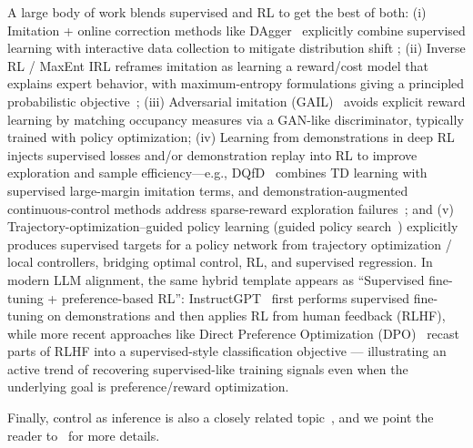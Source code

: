 \documentclass[10pt]{article} %
\begin{document}
A large body of work blends supervised and RL to get the best of both: (i) Imitation + online correction methods like DAgger~\citep{ross2011reductionimitationlearningstructured} explicitly combine supervised learning with interactive data collection to mitigate distribution shift ; (ii) Inverse RL / MaxEnt IRL reframes imitation as learning a reward/cost model that explains expert behavior, with maximum-entropy formulations giving a principled probabilistic objective~\citep{maximum_entropy_inverse_reinforcement_learning}; (iii) Adversarial imitation (GAIL)~\citep{ho2016generativeadversarialimitationlearning} avoids explicit reward learning by matching occupancy measures via a GAN-like discriminator, typically trained with policy optimization; (iv) Learning from demonstrations in deep RL injects supervised losses and/or demonstration replay into RL to improve exploration and sample efficiency—e.g., DQfD~\citep{hester2017deepqlearningdemonstrations} combines TD learning with supervised large-margin imitation terms, and demonstration-augmented continuous-control methods address sparse-reward exploration failures~\citep{nair2018overcomingexplorationreinforcementlearning}; and (v) Trajectory-optimization–guided policy learning (guided policy search~\citep{guided_policy_search}) explicitly produces supervised targets for a policy network from trajectory optimization / local controllers, bridging optimal control, RL, and supervised regression. In modern LLM alignment, the same hybrid template appears as ``Supervised fine-tuning + preference-based RL”: InstructGPT~\citep{ouyang2022traininglanguagemodelsfollow} first performs supervised fine-tuning on demonstrations and then applies RL from human feedback (RLHF), while more recent approaches like Direct Preference Optimization (DPO)~\citep{rafailov2024directpreferenceoptimizationlanguage} recast parts of RLHF into a supervised-style classification objective --- illustrating an active trend of recovering supervised-like training signals even when the underlying goal is preference/reward optimization.

Finally, control as inference is also a closely related topic~\citep{millidge2020relationshipactiveinferencecontrol,odonoghue2020makingsensereinforcementlearning,stochastic_optimal_control,ito2024risksensitive,tarbouriech2023probabilisticinferencereinforcementlearning}, and we point the reader to~\citet{levine2018reinforcementlearningcontrolprobabilistic} for more details.
\end{document}
